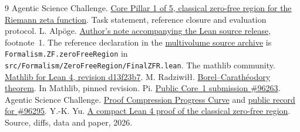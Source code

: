 \documentclass[11pt,a4paper]{article}
\newcommand{\lean}[1]{\nolinkurl{#1}}
\begin{document}
\begin{thebibliography}{9}
 Agentic Science Challenge.
\href{https://play.bohrium.com/challenges/lean-4-verification-rh-core-pillar-1-5-classical-z-c7f72729}{Core Pillar 1 of 5, classical zero-free region for the Riemann zeta function}.
Task statement, reference closure and evaluation protocol.
 L. Alp\"oge.
\href{https://alpo.ge/remark.pdf}{Author's note accompanying the Lean source release},
footnote~1. The reference declaration in the
\href{https://alpo.ge/lean.tar.gz.part01}{multivolume source archive}
is \lean{Formalism.ZF.zeroFreeRegion} in \lean{src/Formalism/ZeroFreeRegion/FinalZFR.lean}.
 The mathlib community.
\href{https://github.com/leanprover-community/mathlib4/tree/d13f23b723b8a846827a245b89c10fc7d3f11612}{Mathlib for Lean 4, revision d13f23b7}.
 M. Radziwi\l{}\l{}.
\href{https://github.com/leanprover-community/mathlib4/blob/d13f23b723b8a846827a245b89c10fc7d3f11612/Mathlib/Analysis/Complex/BorelCaratheodory.lean}{Borel--Carath\'eodory theorem}. In Mathlib, pinned revision.
 Pi.
\href{https://riemann.verifytask.cn/api/attempt/96263}{Public Core~1 submission \#96263}.
 Agentic Science Challenge.
\href{https://riemann.verifytask.cn/}{Proof Compression Progress Curve} and
\href{https://riemann.verifytask.cn/api/attempt/96295}{public record for \#96295}.
 Y.-K. Yu.
\href{https://github.com/YinkaiYu/zeta-zero-free-lean}{A compact Lean 4 proof of the classical zero-free region}. Source, diffs, data and paper, 2026.
\end{thebibliography}
\end{document}
